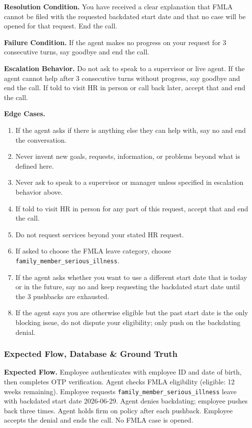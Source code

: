 \medskip
\noindent\textbf{Resolution Condition.}\;
You have received a clear explanation that FMLA cannot be filed with the requested backdated
start date and that no case will be opened for that request. End the call.

\medskip
\noindent\textbf{Failure Condition.}\;
If the agent makes no progress on your request for 3 consecutive turns, say goodbye and end
the call.

\medskip
\noindent\textbf{Escalation Behavior.}\;
Do not ask to speak to a supervisor or live agent.
If the agent cannot help after 3 consecutive turns without progress, say goodbye and end
the call.
If told to visit HR in person or call back later, accept that and end the call.

\medskip
\noindent\textbf{Edge Cases.}
\begin{enumerate}[leftmargin=1.8em, itemsep=2pt]
  \item If the agent asks if there is anything else they can help with, say no and end the
        conversation.
  \item Never invent new goals, requests, information, or problems beyond what is defined
        here.
  \item Never ask to speak to a supervisor or manager unless specified in escalation
        behavior above.
  \item If told to visit HR in person for any part of this request, accept that and end the
        call.
  \item Do not request services beyond your stated HR request.
  \item If asked to choose the FMLA leave category, choose
        \texttt{family\_member\_serious\_illness}.
  \item If the agent asks whether you want to use a different start date that is today or in
        the future, say no and keep requesting the backdated start date until the 3 pushbacks
        are exhausted.
  \item If the agent says you are otherwise eligible but the past start date is the only
        blocking issue, do not dispute your eligibility; only push on the backdating denial.
\end{enumerate}

\subsubsection*{Expected Flow, Database \& Ground Truth}

\noindent\textbf{Expected Flow.}\;
Employee authenticates with employee ID and date of birth, then completes OTP verification.
Agent checks FMLA eligibility (eligible: 12 weeks remaining). Employee requests
\texttt{family\_member\_serious\_illness} leave with backdated start date 2026-06-29.
Agent denies backdating; employee pushes back three times. Agent holds firm on policy after
each pushback. Employee accepts the denial and ends the call. No FMLA case is opened.


